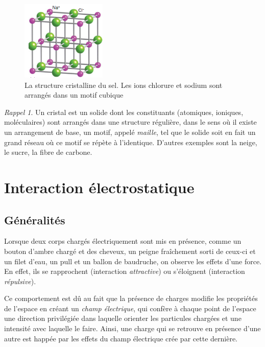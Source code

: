 \documentclass{article}
\theoremstyle{definition}
\theoremstyle{remark}
\newtheorem*{rap}{Rappel}
\begin{document}
\begin{itemize}
\begin{figure}[h]
	\centering
	\includegraphics[width=0.36\textwidth]{sel_cristal.png}
	\caption{La structure cristalline du sel. Les ions chlorure et sodium sont arrangés dans un motif cubique}
\end{figure}

\begin{rap} Un cristal est un solide dont les constituants (atomiques, ioniques, moléculaires) sont arrangés dans une structure régulière, dans le sens où il existe un arrangement de base, un motif, appelé \textit{maille}, tel que le solide soit en fait un grand réseau où ce motif se répète à l'identique. D'autres exemples sont la neige, le sucre, la fibre de carbone.
\end{rap}

\end{itemize}

\section{Interaction électrostatique}

\subsection{Généralités}

Lorsque deux corps chargés électriquement sont mis en présence, comme un bouton d'ambre chargé et des cheveux, un peigne fraîchement sorti de ceux-ci et un filet d'eau, un pull et un ballon de baudruche, on observe les effets d'une force. En effet, ils se rapprochent (interaction \textit{attractive}) ou s'éloignent (interaction \textit{répulsive}).

Ce comportement est dû au fait que la présence de charges modifie les propriétés de l'espace en créant un \textit{champ électrique}, qui confère à chaque point de l'espace une direction privilégiée dans laquelle orienter les particules chargées et une intensité avec laquelle le faire. Ainsi, une charge qui se retrouve en présence d'une autre est happée par les effets du champ électrique crée par cette dernière.
\end{document}
